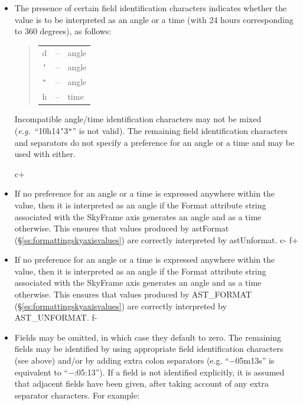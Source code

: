 \documentclass[twoside,11pt]{starlink}
\providecommand{\secref}[1]{\S\ref{#1}}
\begin{document}
\begin{itemize}
\item The presence of certain field identification characters
indicates whether the value is to be interpreted as an angle or a time
(with 24 hours corresponding to 360 degrees), as follows:

\begin{quote}
\begin{tabular}{lll}
d & -- & angle \\
\texttt{'} & -- & angle \\
\texttt{"} & -- & angle \\
h & -- & time
\end{tabular}
\end{quote}

Incompatible angle/time identification characters may not be mixed
(\emph{e.g.}\ ``10h14\texttt{'}3\texttt{"}'' is not valid).  The remaining
field identification characters and separators do not specify a
preference for an angle or a time and may be used with either.

c+
\item If no preference for an angle or a time is expressed anywhere
within the value, then it is interpreted as an angle if the Format
attribute string associated with the SkyFrame axis generates an angle
and as a time otherwise.  This ensures that values produced by
astFormat (\secref{ss:formattingskyaxisvalues}) are correctly
interpreted by astUnformat.
c-
f+
\item If no preference for an angle or a time is expressed anywhere
within the value, then it is interpreted as an angle if the Format
attribute string associated with the SkyFrame axis generates an angle
and as a time otherwise.  This ensures that values produced by
AST\_FORMAT (\secref{ss:formattingskyaxisvalues}) are correctly
interpreted by AST\_UNFORMAT.
f-

\item Fields may be omitted, in which case they default to zero. The
remaining fields may be identified by using appropriate field
identification characters (see above) and/or by adding extra colon
separators (e.g. ``$-$05m13s'' is equivalent to ``$-$:05:13''). If a field
is not identified explicitly, it is assumed that adjacent fields have
been given, after taking account of any extra separator
characters. For example:


\end{itemize}
\end{document}
